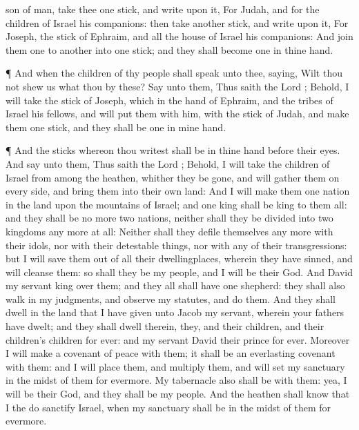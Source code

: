 {son of
man,
take thee
one
stick, and
write upon it, For
Judah, and for the
children of
Israel his
companions: then
take
another
stick, and
write upon it, For
Joseph, the
stick of
Ephraim, and
{} all the
house of
Israel his
companions:
And
join them
one to
another into
one
stick; and they shall become
one in thine
hand.
\par }{\PP {}¶ And when the
children of thy
people shall
speak unto thee,
saying, Wilt thou not
shew us what thou
{} by these?
Say unto them, Thus
saith the
Lord
{}; Behold, I will
take the
stick of
Joseph, which
{} in the
hand of
Ephraim, and the
tribes of
Israel his
fellows, and will
put them with him,
{} with the
stick of
Judah, and
make them
one
stick, and they shall be
one in mine
hand.
\par }{\PP {}¶ And the
sticks whereon thou
writest shall be in thine
hand before their
eyes.
And
say unto them, Thus
saith the
Lord
{}; Behold, I will
take the
children of
Israel from
among the
heathen, whither they be
gone, and will
gather them on every
side, and
bring them into their own
land:
And I will
make them
one
nation in the
land upon the
mountains of
Israel; and
one
king shall be
king to them all: and they shall
be no more
two
nations, neither shall they be
divided into
two
kingdoms any more at all:
Neither shall they
defile themselves any more with their
idols, nor with their detestable
things, nor with any of their
transgressions: but I will
save them out of all their
dwellingplaces, wherein they have
sinned, and will
cleanse them: so shall they be my
people, and I will be their
God.
And
David my
servant
{}
king over them; and they all shall have
one
shepherd: they shall also
walk in my
judgments, and
observe my
statutes, and
do them.
And they shall
dwell in the
land that I have
given unto
Jacob my
servant, wherein your
fathers have
dwelt; and they shall
dwell therein,
{} they, and their
children, and their
children’s
children for
ever: and my
servant
David
{} their
prince
for
ever.
Moreover I will
make a
covenant of
peace with them; it shall be an
everlasting
covenant with them: and I will
place them, and
multiply them, and will
set my
sanctuary in the
midst of them for
evermore.
My
tabernacle also shall be with them: yea, I will be their
God, and they shall be my
people.
And the
heathen shall
know that I the
{} do
sanctify
Israel, when my
sanctuary shall be in the
midst of them for
evermore.

}
